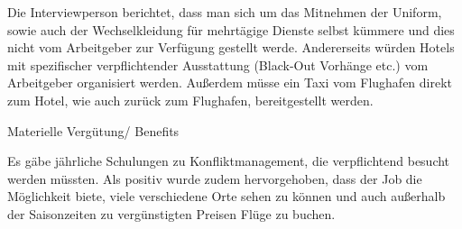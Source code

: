 \documentclass[12pt, a4paper]{article}
\begin{document}
Die Interviewperson berichtet, dass man sich um das Mitnehmen der Uniform, sowie auch der Wechselkleidung für mehrtägige Dienste selbst kümmere und dies nicht vom Arbeitgeber zur Verfügung gestellt werde. Andererseits würden Hotels mit spezifischer verpflichtender Ausstattung (Black-Out Vorhänge etc.) vom Arbeitgeber organisiert werden. Außerdem müsse ein Taxi vom Flughafen direkt zum Hotel, wie auch zurück zum Flughafen, bereitgestellt werden.

Materielle Vergütung/ Benefits

Es gäbe jährliche Schulungen zu Konfliktmanagement, die verpflichtend besucht werden müssten. Als positiv wurde zudem hervorgehoben, dass der Job die Möglichkeit biete, viele verschiedene Orte sehen zu können und auch außerhalb der Saisonzeiten zu vergünstigten Preisen Flüge zu buchen.
\end{document}
